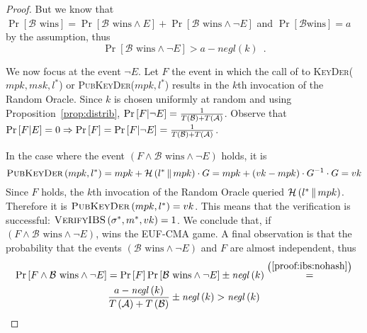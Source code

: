 \begin{proof}
      But we know that $\Pr\left[\mathcal{B} \text{ wins}\right] =
      \Pr\left[\mathcal{B} \text{ wins} \wedge E\right] + \Pr\left[\mathcal{B}
      \text{ wins} \wedge \neg E\right]$ and $\Pr\left[\mathcal{B} \text{
      wins}\right] = a$ by the assumption, thus
      \begin{equation}
        \label{proof:ibs:nohash}
        \Pr\left[\mathcal{B} \text{ wins} \wedge \neg E\right] > a -
        \mathit{negl}\left(k\right) \enspace.
      \end{equation}

      We now focus at the event $\neg E$. Let $F$ the event in which the call of
      to \textsc{KeyDer}($mpk, msk, l^*$) or \textsc{PubKeyDer}($mpk, l^*$)
      results in the $k$th
      invocation of the Random Oracle. Since $k$ is chosen uniformly at random
      and using Proposition~\ref{prop:distrib},
      $\Pr\left[F | \neg E\right] = \frac{1}{T\left(\mathcal{B}\right) +
      T\left(\mathcal{A}\right)}$. Observe that $\Pr\left[F | E\right] = 0
      \Rightarrow \Pr\left[F\right] = \Pr\left[F | \neg E\right] =
      \frac{1}{T\left(\mathcal{B}\right) + T\left(\mathcal{A}\right)}$.

      In the case where the event $\left(F \wedge \mathcal{B} \text{ wins}
      \wedge \neg E\right)$ holds, it is
      \begin{equation*}
        \textsc{PubKeyDer}\left(mpk, l^*\right) = mpk + \mathcal{H}\left(l^*
        \,\|\, mpk\right) \cdot G = mpk + (vk - mpk) \cdot G^{-1} \cdot G = vk
      \end{equation*}
      Since $F$ holds, the $k$th invocation of the Random Oracle queried
      $\mathcal{H}\left(l^* \,\|\, mpk\right)$.
      Therefore it is $\textsc{PubKeyDer}\left(mpk, l^*\right) = vk$. This means
      that the verification is successful: $\textsc{VerifyIBS}\left(\sigma^*,
      m^*, vk\right) = 1$. We conclude that, if $\left(F \wedge
      \mathcal{B} \text{ wins} \wedge \neg E\right)$, \adversary{} wins the
      \textsf{EUF-CMA} game. A final observation is that the probability that
      the events $\left(\mathcal{B} \text{ wins} \wedge \neg E\right)$ and $F$
      are almost independent, thus
      \begin{gather*}
        \Pr\left[F \wedge \mathcal{B} \text{ wins} \wedge \neg E\right] =
        \Pr\left[F\right] \Pr\left[\mathcal{B} \text{ wins} \wedge \neg E\right]
        \pm \mathit{negl}\left(k\right)
        \overset{\left(\ref{proof:ibs:nohash}\right)}{=} \\
        \frac{a - \mathit{negl}\left(k\right)}{T\left(\mathcal{A}\right) +
        T\left(\mathcal{B}\right)} \pm \mathit{negl}\left(k\right) >
        \mathit{negl}\left(k\right)
      \end{gather*}
    \end{proof}
